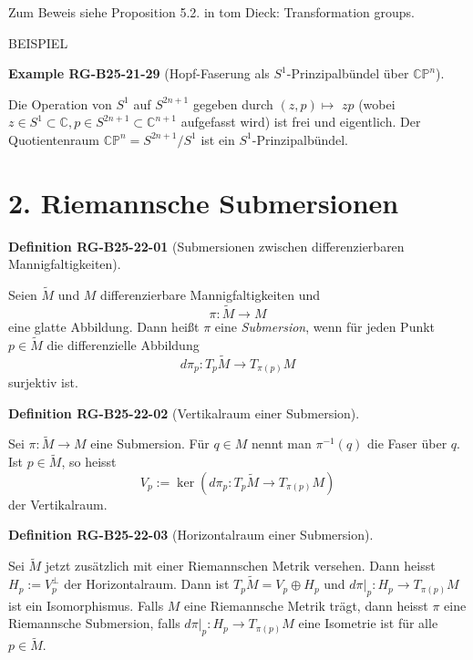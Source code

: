 \documentclass[10pt, letterpaper]{article}
\newcommand{\CustomHeading}[3]{%
  \par\medskip\noindent%
  \textbf{#1 #2} \textnormal{(#3)}.\enskip%
}
\newenvironment{DEF}[2]{\begin{unitbox}\CustomHeading{Definition}{#1}{#2}}{\end{unitbox}}
\newenvironment{EXA}[2]{\begin{unitbox}\CustomHeading{Example}{#1}{#2}}{\end{unitbox}}
\begin{document}
Zum Beweis siehe Proposition 5.2. in tom Dieck: Transformation groups.



BEISPIEL 

\begin{EXA}{RG-B25-21-29}{Hopf-Faserung als $S^1$-Prinzipalbündel über $\mathbb{C P}^n$}
Die Operation von $S^{1}$ auf $S^{2 n+1}$ gegeben durch $(z, p) \mapsto$ $z p$ (wobei $z \in S^{1} \subset \mathbb{C}, p \in S^{2 n+1} \subset \mathbb{C}^{n+1}$ aufgefasst wird) ist frei und eigentlich. Der Quotientenraum $\mathbb{C P}^{n}=S^{2 n+1} / S^{1}$ ist ein $S^{1}$-Prinzipalbündel.
\end{EXA}



\section*{2. Riemannsche Submersionen}



\begin{DEF}{RG-B25-22-01}{Submersionen zwischen differenzierbaren Mannigfaltigkeiten}
Seien $\tilde{M}$ und $M$ differenzierbare Mannigfaltigkeiten und
\[
\pi: \tilde{M} \rightarrow M
\]
eine glatte Abbildung. Dann heißt $\pi$ eine \emph{Submersion}, wenn für jeden Punkt $p \in \tilde{M}$ die differenzielle Abbildung
\[
d\pi_p : T_p \tilde{M} \longrightarrow T_{\pi(p)} M
\]
surjektiv ist.
\end{DEF}





\begin{DEF}{RG-B25-22-02}{Vertikalraum einer Submersion}
Sei $\pi: \tilde{M} \rightarrow M$ eine Submersion. Für $q \in M$ nennt man $\pi^{-1}(q)$ die Faser über $q$. Ist $p \in \tilde{M}$, so heisst
$$
V_{p}:=\operatorname{ker}\left(d \pi_{p}: T_{p} \tilde{M} \rightarrow T_{\pi(p)} M\right)
$$
der Vertikalraum.
\end{DEF}


\begin{DEF}{RG-B25-22-03}{Horizontalraum einer Submersion}
Sei $\tilde{M}$ jetzt zusätzlich mit einer Riemannschen Metrik versehen. Dann heisst $H_{p}:=V_{p}^{\perp}$ der Horizontalraum. Dann ist $T_{p} \tilde{M}=V_{p} \oplus H_{p}$ und $\left.d \pi\right|_{p}: H_{p} \rightarrow T_{\pi(p)} M$ ist ein Isomorphismus. Falls $M$ eine Riemannsche Metrik trägt, dann heisst $\pi$ eine Riemannsche Submersion, falls $\left.d \pi\right|_{p}: H_{p} \rightarrow T_{\pi(p)} M$ eine Isometrie ist für alle $p \in \tilde{M}$.
\end{DEF}
\end{document}
